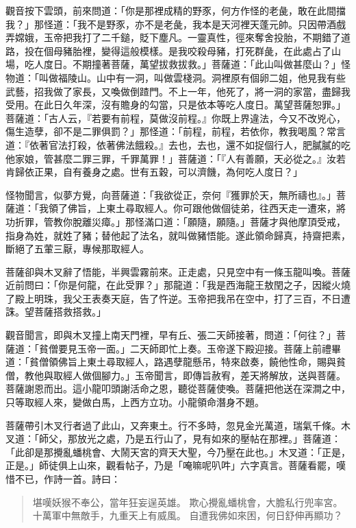 觀音按下雲頭，前來問道：「你是那裡成精的野豕，何方作怪的老彘，敢在此間擋我？」那怪道：「我不是野豕，亦不是老彘，我本是天河裡天蓬元帥。只因帶酒戲弄嫦娥，玉帝把我打了二千鎚，貶下塵凡。一靈真性，徑來奪舍投胎，不期錯了道路，投在個母豬胎裡，變得這般模樣。是我咬殺母豬，打死群彘，在此處占了山場，吃人度日。不期撞著菩薩，萬望拔救拔救。」菩薩道：「此山叫做甚麼山？」怪物道：「叫做福陵山。山中有一洞，叫做雲棧洞。洞裡原有個卵二姐，他見我有些武藝，招我做了家長，又喚做倒蹅門。不上一年，他死了，將一洞的家當，盡歸我受用。在此日久年深，沒有贍身的勾當，只是依本等吃人度日。萬望菩薩恕罪。」菩薩道：「古人云，『若要有前程，莫做沒前程。』你既上界違法，今又不改兇心，傷生造孽，卻不是二罪俱罰？」那怪道：「前程，前程，若依你，教我喝風？常言道：『依著官法打殺，依著佛法餓殺。』去也，去也，還不如捉個行人，肥膩膩的吃他家娘，管甚麼二罪三罪，千罪萬罪！」菩薩道：「『人有善願，天必從之。』汝若肯歸依正果，自有養身之處。世有五穀，可以濟饑，為何吃人度日？」

怪物聞言，似夢方覺，向菩薩道：「我欲從正，奈何『獲罪於天，無所禱也』。」菩薩道：「我領了佛旨，上東土尋取經人。你可跟他做個徒弟，往西天走一遭來，將功折罪，管教你脫離災瘴。」那怪滿口道：「願隨，願隨。」菩薩才與他摩頂受戒，指身為姓，就姓了豬；替他起了法名，就叫做豬悟能。遂此領命歸真，持齋把素，斷絕了五葷三厭，專候那取經人。

菩薩卻與木叉辭了悟能，半興雲霧前來。正走處，只見空中有一條玉龍叫喚。菩薩近前問曰：「你是何龍，在此受罪？」那龍道：「我是西海龍王敖閏之子，因縱火燒了殿上明珠，我父王表奏天庭，告了忤逆。玉帝把我吊在空中，打了三百，不日遭誅。望菩薩搭救搭救。」

觀音聞言，即與木叉撞上南天門裡，早有丘、張二天師接著，問道：「何往？」菩薩道：「貧僧要見玉帝一面。」二天師即忙上奏。玉帝遂下殿迎接。菩薩上前禮畢道：「貧僧領佛旨上東土尋取經人，路遇孽龍懸吊，特來啟奏，饒他性命，賜與貧僧，教他與取經人做個腳力。」玉帝聞言，即傳旨赦宥，差天將解放，送與菩薩。菩薩謝恩而出。這小龍叩頭謝活命之恩，聽從菩薩使喚。菩薩把他送在深澗之中，只等取經人來，變做白馬，上西方立功。小龍領命潛身不題。

菩薩帶引木叉行者過了此山，又奔東土。行不多時，忽見金光萬道，瑞氣千條。木叉道：「師父，那放光之處，乃是五行山了，見有如來的壓帖在那裡。」菩薩道：「此卻是那攪亂蟠桃會、大鬧天宮的齊天大聖，今乃壓在此也。」木叉道：「正是，正是。」師徒俱上山來，觀看帖子，乃是「唵嘛呢叭吽」六字真言。菩薩看罷，嘆惜不已，作詩一首。詩曰：
\begin{quote}
堪嘆妖猴不奉公，當年狂妄逞英雄。
欺心攪亂蟠桃會，大膽私行兜率宮。
十萬軍中無敵手，九重天上有威風。
自遭我佛如來困，何日舒伸再顯功？
\end{quote}


